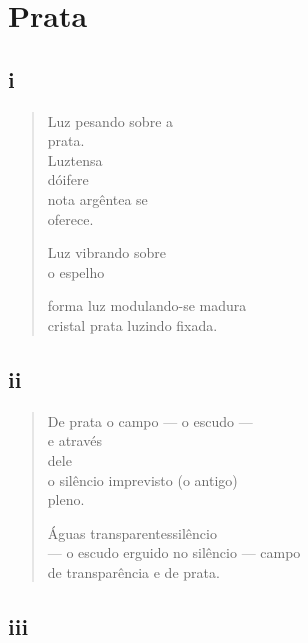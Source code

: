 \chapter{Prata}

\section{i}

\begin{verse}
Luz pesando sobre a\\
\quad\quad\quad{}prata.\\
Luz\quad\quad tensa\\
dói\quad\quad fere\\
\quad nota argêntea se\\
\quad oferece.

Luz vibrando sobre\\
\quad\quad\quad o espelho

forma \quad luz modulando-se \quad madura\\cristal \quad prata luzindo \quad fixada.
\end{verse}

\medskip
\section{ii}

\begin{verse}
De prata o campo --- o escudo ---\\
\hfill{}e através\\
\hfill{}dele\\
o silêncio imprevisto (o antigo)\\
\hfill{}pleno.

Águas transparentes\hfill silêncio\\
--- o escudo erguido no silêncio --- campo\\ de transparência e de prata.
\end{verse}

\medskip
\section{iii}

